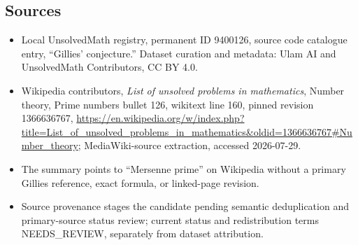 \documentclass[11pt]{article}
\begin{document}
\subsection{Sources}
\begin{itemize}
\item Local UnsolvedMath registry, permanent ID 9400126, source code catalogue entry, ``Gillies' conjecture.'' Dataset curation and metadata: Ulam AI and UnsolvedMath Contributors, CC BY 4.0.
\item Wikipedia contributors, \emph{List of unsolved problems in mathematics}, Number theory, Prime numbers bullet 126, wikitext line 160, pinned revision 1366636767, \url{https://en.wikipedia.org/w/index.php?title=List_of_unsolved_problems_in_mathematics&oldid=1366636767#Number_theory}; MediaWiki-source extraction, accessed 2026-07-29.
\item The summary points to ``Mersenne prime'' on Wikipedia without a primary Gillies reference, exact formula, or linked-page revision.
\item Source provenance stages the candidate pending semantic deduplication and primary-source status review; current status and redistribution terms NEEDS\_REVIEW, separately from dataset attribution.
\end{itemize}
\end{document}
